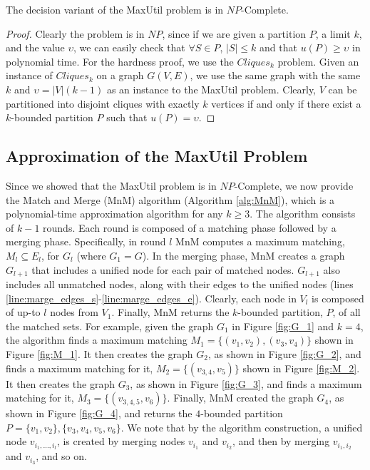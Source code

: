 \documentclass[sigconf,anonymous]{aamas}
\begin{document}
\begin{theorem}
The decision variant of the MaxUtil problem is in $NP$-Complete.
\end{theorem}
\begin{proof}
Clearly the problem is in $NP$, since if we are given a partition $P$, a limit $k$, and the value $\upsilon$, we can easily check that $\forall  S \in P$, $|S| \leq k$ and that $u(P) \geq \upsilon$ in polynomial time. For the hardness proof, we use the $Cliques_k$ problem. 
Given an instance of $Cliques_k$ on a graph $G(V,E)$, we use the same graph with the same $k$ and $\upsilon = |V|(k-1)$ as an instance to the MaxUtil problem. Clearly, $V$ can be partitioned into disjoint cliques with exactly $k$ vertices if and only if there exist a $k$-bounded partition $P$ such that $u(P) = \upsilon$.
\end{proof}

\subsection{Approximation of the MaxUtil Problem}
Since we showed that the MaxUtil problem is in $NP$-Complete, we now provide the Match and Merge (MnM) algorithm (Algorithm \ref{alg:MnM}), which is a polynomial-time approximation algorithm for any $k \geq 3$. 
The algorithm consists of $k-1$ rounds. Each round is composed of a matching phase followed by a merging phase.
Specifically, in round $l$ MnM computes a maximum matching, $M_l \subseteq E_l$, for $G_l$ (where $G_1 = G$). In the merging phase, MnM creates a graph $G_{l+1}$ that includes a unified node for each pair of matched nodes. $G_{l+1}$ also includes all unmatched nodes, along with their edges to the unified nodes (lines \ref{line:marge_edges_s}-\ref{line:marge_edges_e}).
Clearly, each node in $V_l$ is composed of up-to $l$ nodes from $V_1$.
Finally, MnM returns the $k$-bounded partition, $P$, of all the matched sets.
%
For example, given the graph $G_1$ in Figure \ref{fig:G_1} and $k=4$, the algorithm finds a maximum matching $M_1 = \{(v_1,v_2),(v_3,v_4)\}$ shown in Figure \ref{fig:M_1}.  It then creates the graph $G_2$, as shown in Figure \ref{fig:G_2}, and finds a maximum matching for it, $M_2 = \{(v_{3,4},v_5)\}$ shown in Figure \ref{fig:M_2}. It then creates the graph $G_3$, as shown in Figure \ref{fig:G_3}, and finds a maximum matching for it, $M_3=\{(v_{3,4,5}, v_6)\}$. 
Finally, MnM created the graph $G_4$, as shown in Figure \ref{fig:G_4}, and returns the $4$-bounded partition $P={\{v_1,v_2\},\{v_3,v_4,v_5,v_6\}}$.
We note that by the algorithm construction, a unified node $v_{i_1,...,i_l}$, is created by merging nodes $v_{i_1}$ and $v_{i_2}$, and then by merging $v_{i_1,i_2}$ and $v_{i_3}$, and so on.
 
\end{document}

